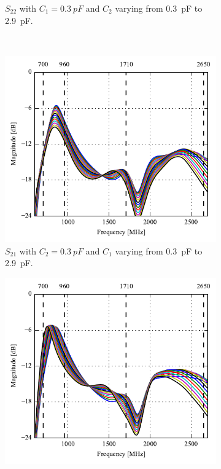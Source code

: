 \begin{figure}[htbp]
\begin{subfigure}{0.49\linewidth}
        \caption{$S_{22}$ with $C_1=\SI{0.3}{pF}$ and $C_2$ varying from \SI{0.3}{pF} to \SI{2.9}{pF}.}
    \end{subfigure}
    \\
    \begin{subfigure}{0.49\linewidth}
        \centering
        \includegraphics{img/tech_sol/trianglefeed/Csh1s21.pdf}
        \caption{$S_{21}$ with $C_2=\SI{0.3}{pF}$ and $C_1$ varying from \SI{0.3}{pF} to \SI{2.9}{pF}.}
    \end{subfigure}
    \hfill
    \begin{subfigure}{0.49\linewidth}
        \centering
        \includegraphics{img/tech_sol/trianglefeed/Csh2s21.pdf}

\end{subfigure}
\end{figure}
